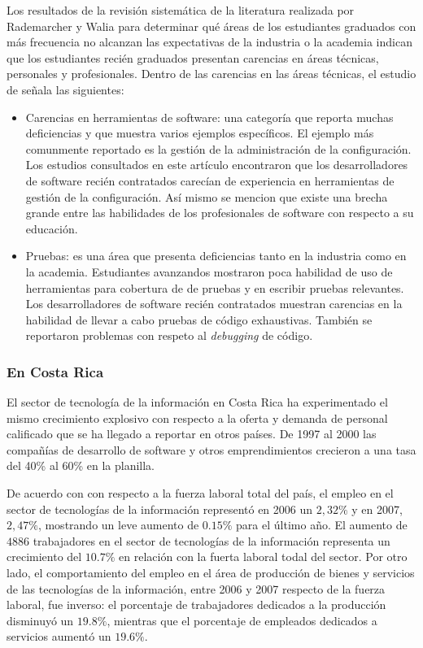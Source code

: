 \documentclass[journal]{IEEEtran}
\begin{document}
Los resultados de la revisión sistemática de la literatura realizada por Rademarcher y Walia \cite{radermacher-walia} para determinar qué áreas de los estudiantes graduados con más frecuencia no alcanzan las expectativas de la industria o la academia indican que los estudiantes recién graduados presentan carencias en áreas técnicas, personales y profesionales. Dentro de las carencias en las áreas técnicas, el estudio de \cite{radermacher-walia} señala las siguientes:
\begin{itemize}
    \item Carencias en herramientas de software: una categoría que reporta muchas deficiencias y que muestra varios ejemplos específicos. El ejemplo más comunmente reportado es la gestión de la administración de la configuración. Los estudios consultados en este artículo encontraron que los desarrolladores de software recién contratados carecían de experiencia en herramientas de gestión de la configuración. Así mismo se mencion que existe una brecha grande entre las habilidades de los profesionales de software con respecto a su educación.
    \item Pruebas: es una área que presenta deficiencias tanto en la industria como en la academia. Estudiantes avanzandos mostraron poca habilidad de uso de herramientas para cobertura de de pruebas y en escribir pruebas relevantes. Los desarrolladores de software recién contratados muestran carencias en la habilidad de llevar a cabo pruebas de código exhaustivas. También se reportaron problemas con respeto al \emph{debugging} de código.
\end{itemize}


\subsubsection{En Costa Rica}
El sector de tecnología de la información en Costa Rica ha experimentado el mismo crecimiento explosivo con respecto a la oferta y demanda de personal calificado que se ha llegado a reportar en otros países. De 1997 al 2000 las compañías de desarrollo de software y otros emprendimientos crecieron a una tasa del 40\% al 60\% en la planilla\cite{cenfotec-2}.

De acuerdo con \cite{prosic} con respecto a la fuerza laboral total del país, el empleo en el sector de tecnologías de la información representó en 2006 un $2,32\%$ y en 2007, $2,47\%$, mostrando un leve aumento de $0.15\%$ para el último año. El aumento de $4886$ trabajadores en el sector de tecnologías de la información representa un crecimiento del $10.7\%$ en relación con la fuerta laboral todal del sector. Por otro lado, el comportamiento del empleo en el área de producción de bienes y servicios de las tecnologías de la información, entre 2006 y 2007 respecto de la fuerza laboral, fue inverso: el porcentaje de trabajadores dedicados a la producción disminuyó un $19.8\%$, mientras que el porcentaje de empleados dedicados a servicios aumentó un $19.6\%$.
\end{document}
